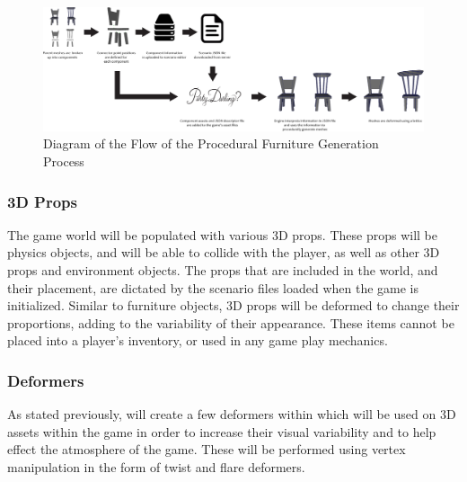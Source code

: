 \begin{figure}[H]
	\centering\includegraphics[width=0.8\linewidth]{images/proceduralFurnitureProcess_Diagram}
	\caption{Diagram of the Flow of the Procedural Furniture Generation Process}
	\label{fig:furniture}
\end{figure}

\subsubsection{3D Props}
The game world will be populated with various 3D props. These props will be physics objects, and will be able to collide with the player, as well as other 3D props and environment objects. The props that are included in the world, and their placement, are dictated by the scenario files loaded when the game is initialized. Similar to furniture objects, 3D props will be deformed to change their proportions, adding to the variability of their appearance. These items cannot be placed into a player's inventory, or used in any game play mechanics.

\subsubsection{Deformers}
As stated previously, \ourteam{} will create a few deformers within \ourengine{} which will be used on 3D assets within the game in order to increase their visual variability and to help effect the atmosphere of the game. These will be performed using vertex manipulation in the form of twist and flare deformers.